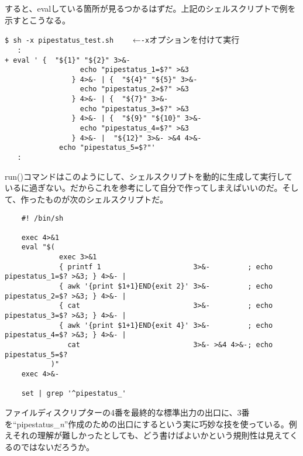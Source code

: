 すると、evalしている箇所が見るつかるはずだ。上記のシェルスクリプトで例を示すとこうなる。
\begin{screen}
	\verb|$ sh -x pipestatus_test.sh| \return 　　←\verb|-x|オプションを付けて実行 \\
	\verb|   :   | \\
	\verb!+ eval ' {  "${1}" "${2}" 3>&-! \\
	\verb!                  echo "pipestatus_1=$?" >&3! \\
	\verb!                } 4>&- | {  "${4}" "${5}" 3>&-! \\
	\verb!                  echo "pipestatus_2=$?" >&3! \\
	\verb!                } 4>&- | {  "${7}" 3>&-! \\
	\verb!                  echo "pipestatus_3=$?" >&3! \\
	\verb!                } 4>&- | {  "${9}" "${10}" 3>&-! \\
	\verb!                  echo "pipestatus_4=$?" >&3! \\
	\verb!                } 4>&- |  "${12}" 3>&- >&4 4>&-! \\
	\verb!             echo "pipestatus_5=$?"'! \\
	\verb|   :   |
\end{screen}

run()コマンドはこのようにして、シェルスクリプトを動的に生成して実行しているに過ぎない。だからこれを参考にして自分で作ってしまえばいいのだ。そして、作ったものが次のシェルスクリプトだ。\\
\begin{frameboxit}{160.0mm}
\begin{verbatim}
	#! /bin/sh

	exec 4>&1
	eval "$(
	         exec 3>&1
	         { printf 1                      3>&-         ; echo pipestatus_1=$? >&3; } 4>&- |
	         { awk '{print $1+1}END{exit 2}' 3>&-         ; echo pipestatus_2=$? >&3; } 4>&- |
	         { cat                           3>&-         ; echo pipestatus_3=$? >&3; } 4>&- |
	         { awk '{print $1+1}END{exit 4}' 3>&-         ; echo pipestatus_4=$? >&3; } 4>&- |
	           cat                           3>&- >&4 4>&-; echo pipestatus_5=$?
	       )"
	exec 4>&-

	set | grep '^pipestatus_'
\end{verbatim}
\end{frameboxit}

ファイルディスクリプターの4番を最終的な標準出力の出口に、3番を``pipestatus\_{}\textit{n}''作成のための出口にするという実に巧妙な技を使っている。例えそれの理解が難しかったとしても、どう書けばよいかという規則性は見えてくるのではないだろうか。
